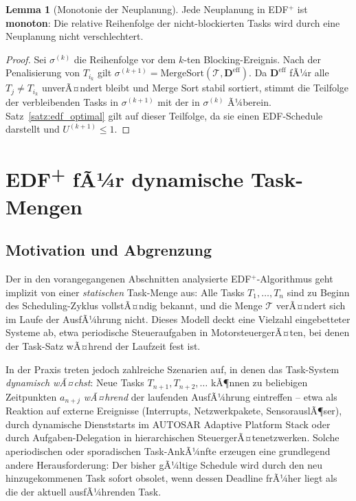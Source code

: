 ﻿\documentclass[a4paper,12pt]{article}
\theoremstyle{definition}
\newtheorem{lemma}{Lemma}
\begin{document}
	\begin{lemma}[Monotonie der Neuplanung]
		Jede Neuplanung in EDF$^+$ ist \textbf{monoton}: Die relative Reihenfolge der
		nicht-blockierten Tasks wird durch eine Neuplanung nicht verschlechtert.
	\end{lemma}

	\begin{proof}
		Sei $\sigma^{(k)}$ die Reihenfolge vor dem $k$-ten Blocking-Ereignis. Nach der
		Penalisierung von $T_{i_k}$ gilt
		$\sigma^{(k+1)} = \mathrm{MergeSort}(\mathcal{T}, \mathbf{D}^{\text{eff}})$.
		Da $\mathbf{D}^{\text{eff}}$ fÃ¼r alle $T_j \neq T_{i_k}$ unverÃ¤ndert bleibt
		und Merge Sort stabil sortiert, stimmt die Teilfolge der verbleibenden Tasks in
		$\sigma^{(k+1)}$ mit der in $\sigma^{(k)}$ Ã¼berein. Satz~\ref{satz:edf_optimal}
		gilt auf dieser Teilfolge, da sie einen EDF-Schedule darstellt und
		$U^{(k+1)} \le 1$.
	\end{proof}

	\section{EDF\textsuperscript{+} fÃ¼r dynamische Task-Mengen}
	\label{sec:dynamisch}

	\subsection{Motivation und Abgrenzung}

	Der in den vorangegangenen Abschnitten analysierte EDF$^+$-Algorithmus geht implizit
	von einer \emph{statischen} Task-Menge aus: Alle Tasks $T_1, \ldots, T_n$ sind zu Beginn
	des Scheduling-Zyklus vollstÃ¤ndig bekannt, und die Menge $\mathcal{T}$ verÃ¤ndert sich
	im Laufe der AusfÃ¼hrung nicht. Dieses Modell deckt eine Vielzahl eingebetteter
	Systeme ab, etwa periodische Steueraufgaben in MotorsteuergerÃ¤ten, bei denen der
	Task-Satz wÃ¤hrend der Laufzeit fest ist.

	In der Praxis treten jedoch zahlreiche Szenarien auf, in denen das Task-System
	\emph{dynamisch wÃ¤chst}: Neue Tasks $T_{n+1}, T_{n+2}, \ldots$ kÃ¶nnen zu
	beliebigen Zeitpunkten $a_{n+j}$ \emph{wÃ¤hrend} der laufenden AusfÃ¼hrung eintreffen
	-- etwa als Reaktion auf externe Ereignisse (Interrupts, Netzwerkpakete, SensorauslÃ¶ser),
	durch dynamische Dienststarts im AUTOSAR Adaptive Platform Stack oder durch
	Aufgaben-Delegation in hierarchischen SteuergerÃ¤tenetzwerken. Solche aperiodischen
	oder sporadischen Task-AnkÃ¼nfte erzeugen eine grundlegend andere Herausforderung:
	Der bisher gÃ¼ltige Schedule wird durch den neu hinzugekommenen Task sofort obsolet,
	wenn dessen Deadline frÃ¼her liegt als die der aktuell ausfÃ¼hrenden Task.
\end{document}
